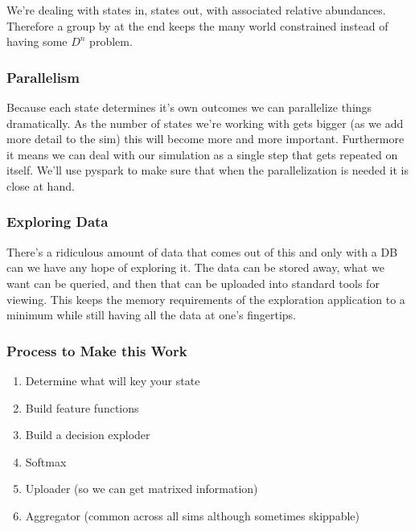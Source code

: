 \documentclass[11pt]{article}
\begin{document}
We're dealing with states in, states out, with associated relative abundances. Therefore a group by at the end keeps the many world constrained instead of having some $D^n$ problem.

\subsubsection{Parallelism}

Because each state determines it's own outcomes we can parallelize things dramatically. As the number of states we're working with gets bigger (as we add more detail to the sim) this will become more and more important. Furthermore it means we can deal with our simulation as a single step that gets repeated on itself. We'll use pyspark to make sure that when the parallelization is needed it is close at hand.

\subsubsection{Exploring Data}
There's a ridiculous amount of data that comes out of this and only with a DB can we have any hope of exploring it. The data can be stored away, what we want can be queried, and then that can be uploaded into standard tools for viewing. This keeps the memory requirements of the exploration application to a minimum while still having all the data at one's fingertips. 

\subsubsection{Process to Make this Work}

\begin{enumerate}
\item Determine what will key your state
\item Build feature functions
\item Build a decision exploder
\item Softmax
\item Uploader (so we can get matrixed information)
\item Aggregator (common across all sims although sometimes skippable)
\end{enumerate}
\end{document}
